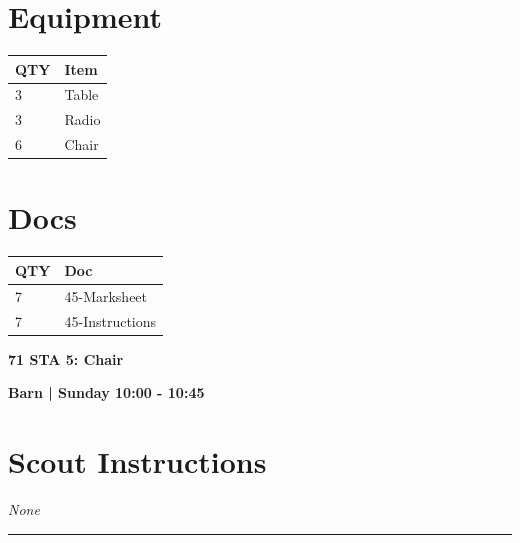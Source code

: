 \documentclass[10pt]{article}
\newcommand{\newtitle}[1]{\begin{center}{\Huge\bfseries #1 }\\ \vspace{5mm}\end{center}}
\newcommand{\newsubtitle}[1]{\begin{center}{\color{grey}\Large\bfseries #1 }\\ \vspace{5mm}\end{center}}
\begin{document}
	\begin{multicols}{2}

		\section*{\faWrench \: Equipment}

		
	\begin{center}
			\begin{tabular}{p{2cm}p{4cm}}


				\textbf{QTY} & \textbf{Item} \\\toprule
												3&Table\\\midrule
												3&Radio\\\midrule
												6&Chair\\\midrule
								\end{tabular}

			\end{center}

		
		\vfill\null
		\columnbreak

			\section*{\faFile \: Docs}
		 	\begin{center}
			\begin{tabular}{p{2cm}p{4cm}}

			\textbf{QTY} & \textbf{Doc} \\\toprule
										7&45-Marksheet\\\midrule
										7&45-Instructions\\\midrule
							\end{tabular}
			\end{center}
	

		\vfill\null

		\end{multicols}



	\vspace{1cm}


	\clearpage
		\newtitle{71 STA 5: Chair }
	\newsubtitle{Barn | Sunday 10:00 - 10:45}
		\setcounter{section}{70}
	\section*{Scout Instructions}
		\textit{None}
	
	\vspace{0.5cm}
	\hrule
	\vspace{0.5cm}
\end{document}

